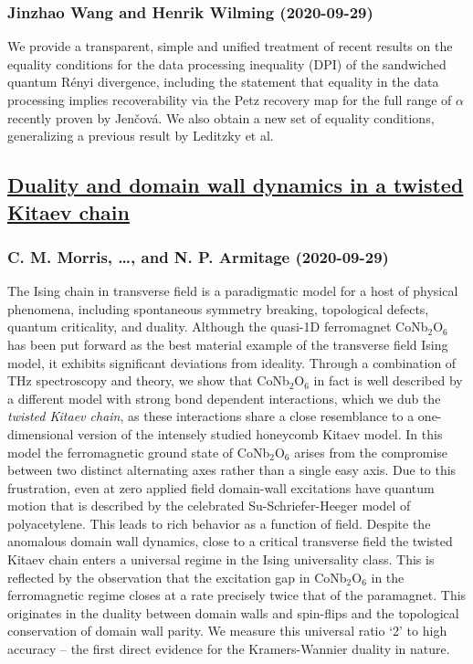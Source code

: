 \subsubsection*{Jinzhao Wang and Henrik Wilming (2020-09-29)}
We provide a transparent, simple and unified treatment of recent results on
the equality conditions for the data processing inequality (DPI) of the
sandwiched quantum R\'enyi divergence, including the statement that equality in
the data processing implies recoverability via the Petz recovery map for the
full range of $\alpha$ recently proven by Jen\v cov\'a. We also obtain a new
set of equality conditions, generalizing a previous result by Leditzky et al.

\subsection*{\href{http://arxiv.org/abs/2009.14189v1}{Duality and domain wall dynamics in a twisted Kitaev chain}}
\subsubsection*{C. M. Morris, \dots, and N. P. Armitage (2020-09-29)}
The Ising chain in transverse field is a paradigmatic model for a host of
physical phenomena, including spontaneous symmetry breaking, topological
defects, quantum criticality, and duality. Although the quasi-1D ferromagnet
CoNb$_2$O$_6$ has been put forward as the best material example of the
transverse field Ising model, it exhibits significant deviations from ideality.
Through a combination of THz spectroscopy and theory, we show that
CoNb$_2$O$_6$ in fact is well described by a different model with strong bond
dependent interactions, which we dub the {\it twisted Kitaev chain}, as these
interactions share a close resemblance to a one-dimensional version of the
intensely studied honeycomb Kitaev model. In this model the ferromagnetic
ground state of CoNb$_2$O$_6$ arises from the compromise between two distinct
alternating axes rather than a single easy axis. Due to this frustration, even
at zero applied field domain-wall excitations have quantum motion that is
described by the celebrated Su-Schriefer-Heeger model of polyacetylene. This
leads to rich behavior as a function of field. Despite the anomalous domain
wall dynamics, close to a critical transverse field the twisted Kitaev chain
enters a universal regime in the Ising universality class. This is reflected by
the observation that the excitation gap in CoNb$_2$O$_6$ in the ferromagnetic
regime closes at a rate precisely twice that of the paramagnet. This originates
in the duality between domain walls and spin-flips and the topological
conservation of domain wall parity. We measure this universal ratio `2' to high
accuracy -- the first direct evidence for the Kramers-Wannier duality in
nature.

